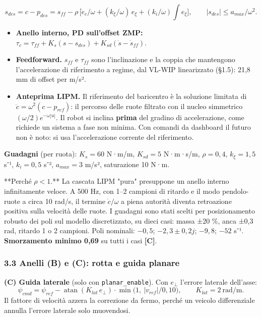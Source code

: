 \documentclass[
]{article}
\providecommand{\tightlist}{%
  \setlength{\itemsep}{0pt}\setlength{\parskip}{0pt}}
\begin{document}
\[s_{des} = c - p_{des} = s_{ff} - \rho\,\big[\dot e_c/\omega + (k_\xi/\omega)\,e_\xi + (k_i/\omega)\!\textstyle\int e_\xi\big],\qquad |s_{des}| \le a_{max}/\omega^2 .\]

\begin{itemize}
\tightlist
\item \textbf{Anello interno, PD sull'offset ZMP:} \(\tau_c = \tau_{ff} + K_s(s - s_{des}) + K_{sd}(\dot s - \dot s_{ff})\).
\item \textbf{Feedforward.} \(s_{ff}\) e \(\tau_{ff}\) sono l'inclinazione e la coppia che mantengono l'accelerazione di riferimento a regime, dal VL-WIP linearizzato (§1.5): 21,8 mm di offset per m/s².
\item \textbf{Anteprima LIPM.} Il riferimento del baricentro è la soluzione limitata di \(\ddot c = \omega^2(c - p_{ref})\): il percorso delle ruote filtrato con il nucleo simmetrico \((\omega/2)e^{-\omega|u|}\). Il robot si inclina \textbf{prima} del gradino di accelerazione, come richiede un sistema a fase non minima. Con comandi da dashboard il futuro non è noto: si usa l'accelerazione corrente del riferimento.
\end{itemize}

\textbf{Guadagni} (per ruota): \(K_s = 60\) N·m/m, \(K_{sd} = 5\) N·m·s/m, \(\rho = 0{,}4\), \(k_\xi = 1{,}5\) s⁻¹, \(k_i = 0{,}5\) s⁻², \(a_{max} = 3\) m/s², saturazione 10 N·m.

**Perché \(\rho < 1\).** La cascata LIPM "pura" presuppone un anello interno infinitamente veloce. A 500 Hz, con 1–2 campioni di ritardo e il modo pendolo-ruote a circa 10 rad/s, il termine \(\dot c/\omega\) a piena autorità diventa retroazione positiva sulla velocità delle ruote. I guadagni sono stati scelti per posizionamento robusto dei poli sul modello discretizzato, su dieci casi: massa ±20 \%, anca ±0,3 rad, ritardo 1 o 2 campioni. Poli nominali: \(-0{,}5\); \(-2{,}3\pm0{,}2j\); \(-9{,}8\); \(-52\) s⁻¹. \textbf{Smorzamento minimo 0,69} su tutti i casi \textbf{[C]}.

\subsubsection{3.3 Anelli (B) e (C): rotta e guida planare}\label{33-anelli-b-e-c-rotta-e-guida-planare}

\textbf{(C) Guida laterale} (solo con \texttt{planar\_enable}). Con \(e_\perp\) l'errore laterale dell'asse: \[\psi_{cmd} = \psi_{ref} - \operatorname{atan}(K_{lat}\,e_\perp)\cdot\min\!\big(1,\ |v_{ref}|/0{,}10\big),\qquad K_{lat} = 2\ \text{rad/m}.\] Il fattore di velocità azzera la correzione da fermo, perché un veicolo differenziale annulla l'errore laterale solo muovendosi.
\end{document}
